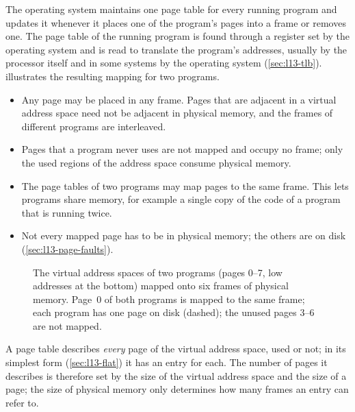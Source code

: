 \documentclass[../main.tex]{subfiles}
\begin{document}
The operating system maintains one page table for every running program and
updates it whenever it places one of the program's pages into a frame or
removes one.  The page table of the running program is found through a
register set by the operating system and is read to translate the program's
addresses, usually by the processor itself and in some systems by the
operating system (\cref{sec:l13-tlb}).   illustrates
the resulting mapping for two programs.
\begin{itemize}
  \item Any page may be placed in any frame.  Pages that are adjacent in a
    virtual address space need not be adjacent in physical memory, and the
    frames of different programs are interleaved.
  \item Pages that a program never uses are not mapped and occupy no frame;
    only the used regions of the address space consume physical memory.
  \item The page tables of two programs may map pages to the same frame.  This
    lets programs share memory, for example a single copy of the code of a
    program that is running twice.
  \item Not every mapped page has to be in physical memory; the others are on
    disk (\cref{sec:l13-page-faults}).
\end{itemize}

\begin{figure}[htbp]
  \centering
  
  \caption{The virtual address spaces of two programs (pages 0--7, low
    addresses at the bottom) mapped onto six frames of physical memory.  Page~0
    of both programs is mapped to the same frame; each program has one page on
    disk (dashed); the unused pages 3--6 are not mapped.}
  \label{fig:l13-mapping}
\end{figure}

A page table describes \emph{every} page of the virtual address space, used
or not; in its simplest form (\cref{sec:l13-flat}) it has an entry for each.
The number of pages it describes is therefore set by the size of the virtual
address space and the size of a page; the size of physical memory only
determines how many frames an entry can refer to.
\end{document}

